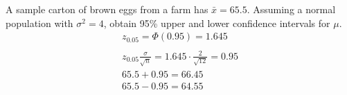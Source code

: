 \documentclass[letterpaper,12pt,fleqn]{article}
\newcommand{\m}{\mu}
\renewcommand{\o}{\sigma}
\renewcommand{\P}{\Phi}
\begin{document}
\begin{example}
  A sample carton of brown eggs from a farm has \(\bar{x}=65.5\).  Assuming a normal population with \(\o^2=4\), obtain 95\%
  upper and lower confidence intervals for \(\m\).
  \begin{gather*}
    z_{0.05}=\P(0.95)=1.645 \\
    \\
    z_{0.05}\frac{\o}{\sqrt{n}}=1.645\cdot\frac{2}{\sqrt{12}}=0.95
    \\
    65.5+0.95=66.45 \\
    65.5-0.95=64.55
  \end{gather*}
\end{example}
\end{document}
